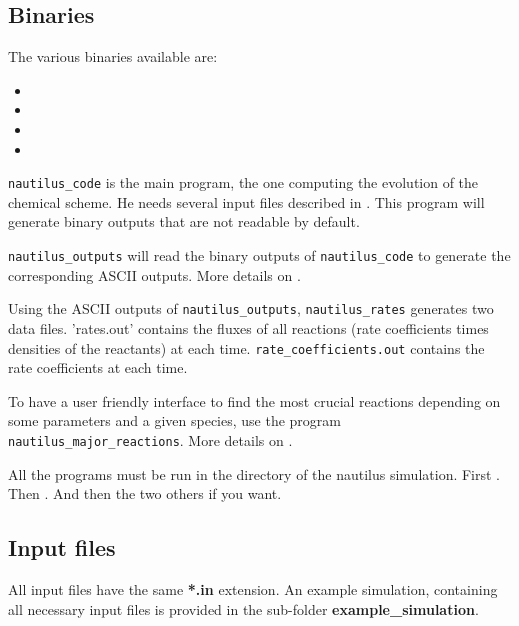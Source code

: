 \documentclass[english,a4paper,twoside]{article}
\begin{document}
\subsection{Binaries}
The various binaries available are:
\begin{itemize}
\item {}
\item {}
\item {}
\item {}
\end{itemize}

\verb|nautilus_code| is the main program, the one computing the evolution of the chemical scheme. He needs several input files 
described in . This program will generate binary outputs that are not readable by default.

\verb|nautilus_outputs| will read the binary outputs of \verb|nautilus_code| to generate the corresponding ASCII outputs. More 
details on .

Using the ASCII outputs of \verb|nautilus_outputs|, \verb|nautilus_rates| generates two data files. 'rates.out' contains the fluxes of all reactions (rate coefficients times densities of the reactants) at each time.  \verb|rate_coefficients.out| contains the rate coefficients at each time. 

To have a user friendly interface to find the most crucial reactions depending on some parameters and a given species, use the 
program \verb|nautilus_major_reactions|. More details on .

\begin{remarque}
All the programs must be run in the directory of the nautilus simulation. First . 
Then . And then the two others if you want.
\end{remarque}



\subsection{Input files}\label{sec:input-files}
All input files have the same \textbf{*.in} extension. An example simulation, containing all necessary input files is provided in the sub-folder \textbf{example\_simulation}.
\end{document}
